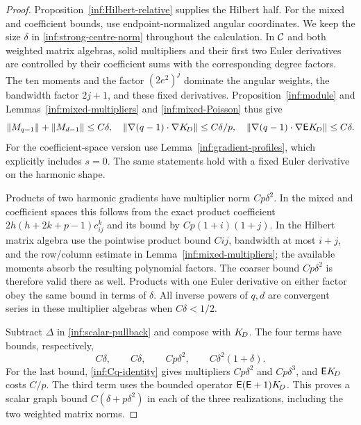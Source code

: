 \begin{proof}
Proposition~\ref{inf:Hilbert-relative} supplies the Hilbert half.
For the mixed and coefficient bounds, use endpoint-normalized
angular coordinates.
We keep the size $\delta$ in \eqref{inf:strong-centre-norm}
throughout the calculation. In $\mathcal C$ and both weighted matrix
algebras, solid multipliers and their first two Euler derivatives
are controlled by their coefficient sums with the corresponding
degree factors. The ten moments and the factor $(2e^2)^j$
dominate the angular weights, the bandwidth factor $2j+1$, and
these fixed derivatives. Proposition~\ref{inf:module} and
Lemmas~\ref{inf:mixed-multipliers} and \ref{inf:mixed-Poisson} thus give
\[
 \lVert M_{q-1}\rVert+\lVert M_{d-1}\rVert\le C\delta,
 \quad
 \lVert \nabla(q-1)\cdot\nabla K_{\!D}\rVert\le C\delta/p,
 \quad
 \lVert \nabla(q-1)\cdot\nabla\mathsf EK_{\!D}\rVert\le C\delta.
\]
For the coefficient-space version use
Lemma~\ref{inf:gradient-profiles}, which explicitly includes $s=0$.
The same statements hold with a fixed Euler derivative on the
harmonic shape.

Products of two harmonic gradients have multiplier norm
$Cp\delta^2$. In the mixed and coefficient spaces this follows
from the exact product coefficient $2h(h+2k+p-1)c_{ij}^k$
and its bound by $Cp(1+i)(1+j)$.
In the Hilbert matrix algebra use the pointwise product bound
$Cij$, bandwidth at most $i+j$, and the row/column estimate in
Lemma~\ref{inf:mixed-multipliers}; the available moments absorb
the resulting polynomial factors. The coarser bound $Cp\delta^2$
is therefore valid there as well. Products with one Euler
derivative on either factor obey the same bound in terms of
$\delta$.
All inverse powers of $q,d$ are convergent series in these
multiplier algebras when $C\delta<1/2$.

Subtract $\Delta$ in \eqref{inf:scalar-pullback} and compose with
$K_{\!D}$. The four terms have bounds, respectively,
\begin{equation}\label{inf:scalar-four-bounds}
 C\delta,\qquad C\delta,\qquad Cp\delta^2,
                 \qquad C\delta^2(1+\delta).
\end{equation}
For the last bound, \eqref{inf:Cq-identity} gives multipliers
$Cp\delta^2$ and $Cp\delta^3$, and
$\mathsf EK_{\!D}$ costs $C/p$.
The third term uses the bounded operator
$\mathsf E(\mathsf E+1)K_{\!D}$.
This proves a scalar graph bound $C(\delta+p\delta^2)$ in each
of the three realizations, including the two weighted matrix
norms.


\end{proof}
